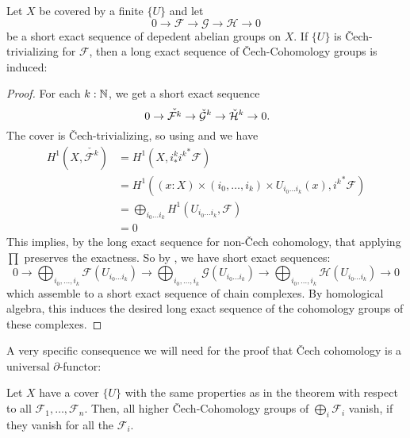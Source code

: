 \begin{theorem}%
  \label{chech-les}
  Let $X$ be covered by a finite $\{U\}$ and let 
  \[ 0\to \mathcal F\to \mathcal G\to \mathcal H\to 0\]
  be a short exact sequence of depedent abelian groups on $X$.
  If $\{U\}$ is \v{C}ech-trivializing for $\mathcal F$,
  then a long exact sequence of \v{C}ech-Cohomology groups is induced:
  \begin{center}
  \end{center}
\end{theorem}

\begin{proof}
  For each $k:\mathbb{N}$, we get a short exact sequence
  \[
    0\to \check{\mathcal F^k}\to \check{\mathcal G}^k\to \check{\mathcal H}^k\to 0
    \rlap{.}
  \]
  The cover is \v{C}ech-trivializing, so using  and  we have
  \begin{align*}
    H^1(X,\check{\mathcal F^k})&=H^1(X,i_\ast^k {i^k}^\ast\mathcal F) \\
                               &=H^1((x:X)\times (i_0,\dots,i_k)\times U_{i_0\dots i_k}(x),{i^k}^\ast\mathcal F) \\
                               &=\bigoplus_{i_0\dots i_k} H^1(U_{i_0\dots i_k},\mathcal F) \\
                               &=0    
  \end{align*}
  This implies, by the long exact sequence for non-\v{C}ech cohomology, that applying $\prod$ preserves the exactness.
  So by , we have short exact sequences:
  \[
  0\to \bigoplus_{i_0,\dots,i_k}\mathcal F(U_{i_0\dots i_k}) \to \bigoplus_{i_0,\dots,i_k}\mathcal G(U_{i_0\dots i_k}) \to \bigoplus_{i_0,\dots,i_k}\mathcal H(U_{i_0\dots i_k})\to 0
  \]
  which assemble to a short exact sequence of chain complexes.
  By homological algebra, this induces the desired long exact sequence of the cohomology groups of these complexes.
\end{proof}

A very specific consequence we will need for the proof that \v{C}ech cohomology is a universal $\partial$-functor:

\begin{corollary}%
  \label{chech-coefficient-sum}
  Let $X$ have a cover $\{U\}$ with the same properties as in the theorem with respect to all $\mathcal F_1,\dots,\mathcal F_n$.
  Then, all higher \v{C}ech-Cohomology groups of $\bigoplus_{i}\mathcal F_i$ vanish,
  if they vanish for all the $\mathcal F_i$.
\end{corollary}
